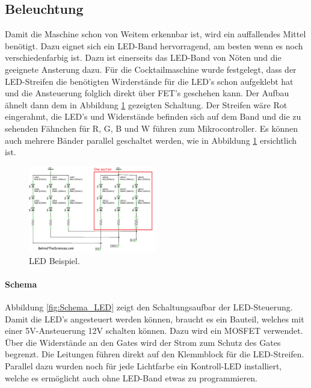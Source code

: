 \subsection{Beleuchtung}
\label{subsec:Beleuchtung_2}

Damit die Maschine schon von Weitem erkennbar ist, wird ein auffallendes Mittel benötigt. Dazu eignet sich ein LED-Band hervorragend, am besten wenn es noch verschiedenfarbig ist. Dazu ist einerseits das LED-Band von Nöten und die geeignete Ansterung dazu. Für die Cocktailmaschine wurde festgelegt, dass der LED-Streifen die benötigten Wirderstände für die LED's schon aufgeklebt hat und die Ansteuerung folglich direkt über FET's geschehen kann. Der Aufbau ähnelt dann dem in Abbildung \ref{fig:LED1} gezeigten Schaltung. Der Streifen wäre Rot eingerahmt, die LED's und Widerstände befinden sich auf dem Band und die zu sehenden Fähnchen für R, G, B und W führen zum Mikrocontroller. Es können auch mehrere Bänder parallel geschaltet werden, wie in Abbildung \ref{fig:LED1} ersichtlich ist.

\begin{figure}[h!]
\center
\includegraphics[width = 0.5\textwidth]{graphics/Schema_LED1}
\caption{LED Beispiel. \cite{behindthesciences_rgb_2017}}
\label{fig:LED1}
\end{figure}

\paragraph{Schema}\mbox{}

Abbildung \ref{fig:Schema_LED} zeigt den Schaltungsaufbar der LED-Steuerung. Damit die LED's angesteuert werden können, braucht es ein Bauteil, welches mit einer 5V-Ansteuerung 12V schalten können. Dazu wird ein MOSFET verwendet. Über die Widerstände an den Gates wird der Strom zum Schutz des Gates begrenzt. Die Leitungen führen direkt auf den Klemmblock für die LED-Streifen. Parallel dazu wurden noch für jede Lichtfarbe ein Kontroll-LED installiert, welche es ermöglicht auch ohne LED-Band etwas zu programmieren.


